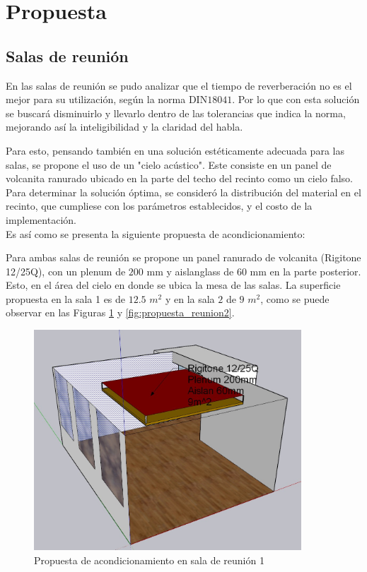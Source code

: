 \section{Propuesta}
\subsection{Salas de reunión}
En las salas de reunión se pudo analizar que el tiempo de reverberación no es el mejor para su 
utilización, según la norma DIN$18041$. Por lo que con esta solución se buscará disminuirlo y llevarlo dentro de las tolerancias que indica la norma, 
mejorando así la inteligibilidad y la claridad del habla.

Para esto, pensando también en una solución estéticamente adecuada para las salas, se propone el uso de un "cielo acústico".
Este consiste en un panel de volcanita ranurado ubicado en la parte del techo del recinto como un cielo falso. Para determinar la solución óptima, 
se consideró la distribución del material en el recinto, que cumpliese con los parámetros establecidos, y el costo de la implementación. \\

Es así como se presenta la siguiente propuesta de acondicionamiento:

Para ambas salas de reunión se propone un panel ranurado de volcanita (Rigitone 12/25Q), con un plenum de $200$ mm y aislanglass de $60$ mm en la parte posterior. 
Esto, en el área del cielo en donde se ubica la mesa de las salas. La superficie propuesta en la sala 1 es de $12.5$ $m^2$ y en la sala $2$ de $9$ $m^2$, como se puede observar en las Figuras \ref{fig:propuesta_reunion1} y \ref{fig:propuesta_reunion2}.

\begin{figure}[H]
    \centering
    \includegraphics[width=10cm]{Imagenes/Propuesta/propuesta_reunion1.jpg}
    \caption{Propuesta de acondicionamiento en sala de reunión 1}
    \label{fig:propuesta_reunion1}
\end{figure}

